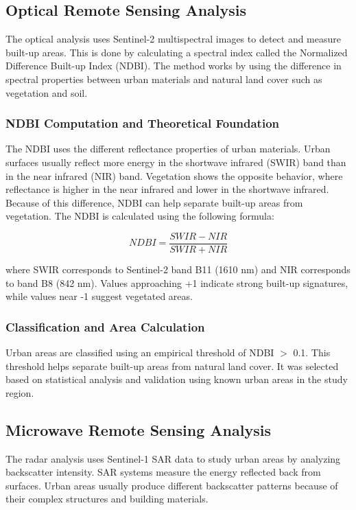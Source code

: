 \documentclass[conference]{IEEEtran}
\begin{document}
\subsection{Optical Remote Sensing Analysis}

The optical analysis uses Sentinel-2 multispectral images to detect and measure built-up areas. This is done by calculating a spectral index called the Normalized Difference Built-up Index (NDBI). The method works by using the difference in spectral properties between urban materials and natural land cover such as vegetation and soil.

\subsubsection{NDBI Computation and Theoretical Foundation}
The NDBI uses the different reflectance properties of urban materials. Urban surfaces usually reflect more energy in the shortwave infrared (SWIR) band than in the near infrared (NIR) band. Vegetation shows the opposite behavior, where reflectance is higher in the near infrared and lower in the shortwave infrared. Because of this difference, NDBI can help separate built-up areas from vegetation. The NDBI is calculated using the following formula:

\begin{equation}
NDBI = \frac{SWIR - NIR}{SWIR + NIR}
\end{equation}

where SWIR corresponds to Sentinel-2 band B11 (1610 nm) and NIR corresponds to band B8 (842 nm). Values approaching +1 indicate strong built-up signatures, while values near -1 suggest vegetated areas.

\subsubsection{Classification and Area Calculation}
Urban areas are classified using an empirical threshold of NDBI $>$ 0.1. This threshold helps separate built-up areas from natural land cover. It was selected based on statistical analysis and validation using known urban areas in the study region.

\subsection{Microwave Remote Sensing Analysis}

The radar analysis uses Sentinel-1 SAR data to study urban areas by analyzing backscatter intensity. SAR systems measure the energy reflected back from surfaces. Urban areas usually produce different backscatter patterns because of their complex structures and building materials.
\end{document}
